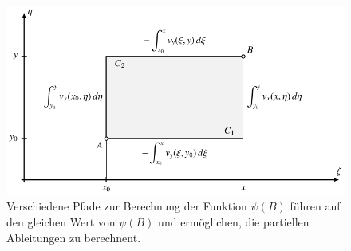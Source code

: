 \begin{figure}
\centering
\includegraphics{chapters/2/green-curves.pdf}
\caption{Verschiedene Pfade zur Berechnung der Funktion $\psi(B)$
führen auf den gleichen Wert von $\psi(B)$ und ermöglichen, die partiellen
Ableitungen zu berechnent.
\label{skript:psi-pfade}}
\end{figure}

